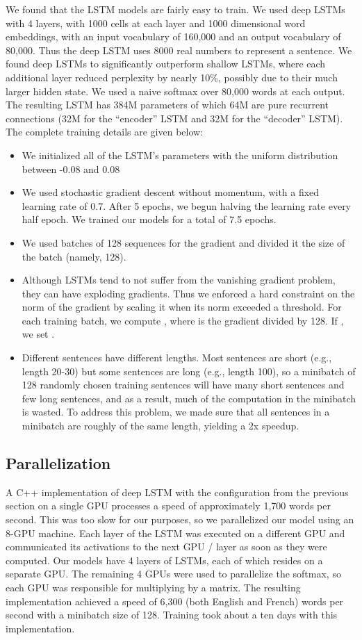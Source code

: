 \documentclass{article} \usepackage{nips14submit_e}
\begin{document}
We found that the LSTM models are fairly easy to train.  We used deep
LSTMs with 4 layers, with 1000 cells at each layer and 1000
dimensional word embeddings, with an input vocabulary of 160,000
and an output vocabulary of 80,000.  Thus the deep LSTM uses 8000 real 
numbers to represent a sentence. We found deep LSTMs to
significantly outperform shallow LSTMs, where each additional layer
reduced perplexity by nearly 10\%, possibly due to their much larger
hidden state.  We used a naive softmax over 80,000 words at each
output.  The resulting LSTM has 384M parameters of which 64M are pure
recurrent connections (32M for the ``encoder'' LSTM and 32M for the
``decoder'' LSTM). The complete training details are given below:
\begin{itemize}
\item We initialized all of the LSTM's parameters with the uniform distribution between
  -0.08 and 0.08
\item We used stochastic gradient descent without momentum,
  with a fixed learning rate of 0.7.  After 5 epochs, we begun
  halving the learning rate every half epoch.  We trained our models for a
  total of 7.5 epochs.
\item We used batches of 128 sequences for the gradient and divided it
  the size of the batch (namely, 128).
\item Although LSTMs tend to not suffer from the vanishing gradient
  problem, they can have exploding gradients.  Thus we enforced a hard
  constraint on the norm of the gradient
  \cite{graves13c,razvan} by scaling it when its norm exceeded
  a threshold. For each training batch, we compute , where  is the gradient divided by 128. If , we set
  .
\item Different sentences have different lengths.  Most sentences are
  short (e.g., length 20-30) but some sentences are long (e.g., length
   100), so a minibatch of 128 randomly chosen training sentences
  will have many short sentences and few long sentences, and as a
  result, much of the computation in the minibatch is wasted.  To
  address this problem, we made sure that all sentences in a
  minibatch are roughly of the same length, yielding a 2x speedup.
\end{itemize}


\subsection{Parallelization}

A C++ implementation of deep LSTM with the configuration from the
previous section on a single GPU processes a speed of approximately
1,700 words per second.  This was too slow for our purposes, so we 
parallelized our model using an 8-GPU machine.  Each layer of the LSTM
was executed on a different GPU and communicated its activations
to the next GPU / layer as soon as they were computed.  Our models
have 4 layers of LSTMs, each of which resides on a separate GPU.  The remaining
4 GPUs were used to parallelize the softmax, so each GPU was
responsible for multiplying by a  matrix.  The
resulting implementation achieved a speed of 6,300 (both English and
French) words per second with a minibatch size of 128. 
Training took about a ten days with this implementation.
\end{document}

